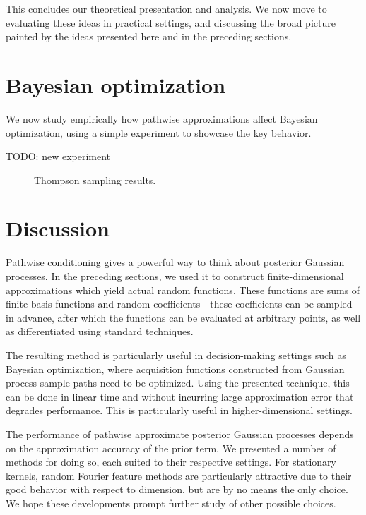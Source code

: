\documentclass[11pt]{book}
\begin{document}
This concludes our theoretical presentation and analysis.
We now move to evaluating these ideas in practical settings, and discussing the broad picture painted by the ideas presented here and in the preceding sections.

\section{Bayesian optimization}

We now study empirically how pathwise approximations affect Bayesian optimization, using a simple experiment to showcase the key behavior.

TODO: new experiment

\begin{figure*}

\caption{Thompson sampling results.}
\end{figure*}

\section{Discussion}

Pathwise conditioning gives a powerful way to think about posterior Gaussian processes.
In the preceding sections, we used it to construct finite-dimensional approximations which yield actual random functions.
These functions are sums of finite basis functions and random coefficients---these coefficients can be sampled in advance, after which the functions can be evaluated at arbitrary points, as well as differentiated using standard techniques.

The resulting method is particularly useful in decision-making settings such as Bayesian optimization, where acquisition functions constructed from Gaussian process sample paths need to be optimized.
Using the presented technique, this can be done in linear time and without incurring large approximation error that degrades performance.
This is particularly useful in higher-dimensional settings.

The performance of pathwise approximate posterior Gaussian processes depends on the approximation accuracy of the prior term.
We presented a number of methods for doing so, each suited to their respective settings.
For stationary kernels, random Fourier feature methods are particularly attractive due to their good behavior with respect to dimension, but are by no means the only choice.
We hope these developments prompt further study of other possible choices.
\end{document}

